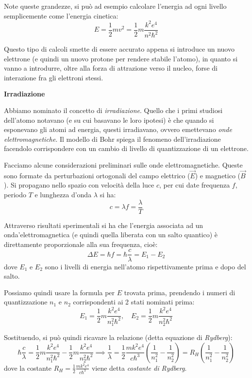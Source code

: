 \documentclass[a4paper,11pt]{article}
\begin{document}
\begin{itemize}
	Note queste grandezze, si può ad esempio calcolare l'energia ad ogni livello semplicemente come l'energia cinetica:
	$$
	E = \frac{1}{2} m v^2 = \frac{1}{2} m \frac{k^2 e^4}{n^2 \hbar^2}
	$$

	Questo tipo di calcoli smette di essere accurato appena si introduce un nuovo elettrone (e quindi un nuovo protone per rendere stabile l'atomo), in quanto si vanno a introdurre, oltre alla forza di attrazione verso il nucleo, forse di interazione fra gli elettroni stessi.

		\par\smallskip
		
		\noindent
		\textbf{\textsf{Irradiazione}}

		\noindent
		Abbiamo nominato il concetto di \textit{irradiazione}. Quello che i primi studiosi dell'atomo notavano (e su cui basavano le loro ipotesi) è che quando si esponevano gli atomi ad energia, questi irradiavano, ovvero emettevano \textit{onde elettromagnetiche}. Il modello di Bohr spiega il fenomeno dell'irradiazione facendolo corrispondere con un cambio di livello di quantizzazione di un elettrone.

		Facciamo alcune considerazioni preliminari sulle onde elettromagnetiche. Queste sono formate da perturbazioni ortogonali del campo elettrico ($\vec{E}$) e magnetico ($\vec{B}$). Si propagano nello spazio con velocità della luce $c$, per cui date frequenza $f$, periodo $T$ e lunghezza d'onda $\lambda$ si ha:
		$$
			c = \lambda f = \frac{\lambda}{T}
		$$

		Attraverso risultati sperimentali si ha che l'energia associata ad un onda'elettromagnetica (e quindi quella liberata con un salto quantico) è direttamente proporzionale alla sua frequenza, cioè:
		$$
			\Delta E = \hbar f = \hbar \frac{c}{\lambda} = E_1 - E_2
		$$
		dove $E_1$ e $E_2$ sono i livelli di energia nell'atomo rispettivamente prima e dopo del salto.

		Possiamo quindi usare la formula per $E$ trovata prima, prendendo i numeri di quantizzazione $n_1$ e $n_2$ corrispondenti ai 2 stati nominati prima:
		$$
			E_1 = \frac{1}{2} m \frac{k^2 e^4}{n_1^2 \hbar^2}, \quad E_2 = \frac{1}{2} m \frac{k^2 e^4}{n_2^2 \hbar^2}
		$$

		Sostituendo, si può quindi ricavare la relazione (detta equazione di \textit{Rydberg}):
		$$
		\hbar \frac{c}{\lambda} = \frac{1}{2} m \frac{k^2 e^4}{n_1^2 \hbar^2} - \frac{1}{2} m \frac{k^2 e^4}{n_2^2 \hbar^2} \implies \frac{1}{\lambda} = \frac{1}{2} \frac{m k^2 e^4}{c \hbar^3} \left( \frac{1}{n_1^2} - \frac{1}{n_2^2} \right) = R_H \left( \frac{1}{n_1^2} - \frac{1}{n_2^2} \right)
		$$
		dove la costante $R_H = \frac{1}{2} \frac{m k^2 e^4}{c \hbar^3}$ viene detta \textit{costante di Rydberg}.
	

\end{itemize}
\end{document}

